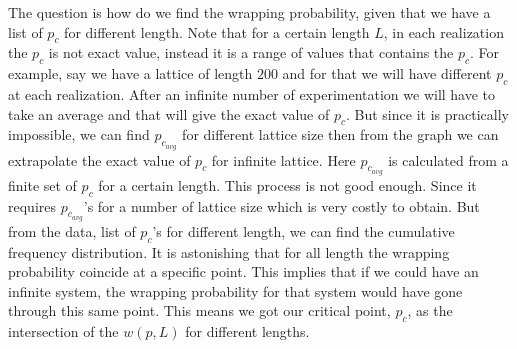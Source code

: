 	The question is how do we find the wrapping probability, given that we have a list of $p_c$ for different length. Note that for a certain length $L$, in each realization the $p_c$ is not exact value, instead it is a range of values that contains the $p_c$. For example, say we have a lattice of length $200$ and for that we will have different $p_c$ at each realization. After an infinite number of experimentation we will have to take an average and that will give the exact value of $p_c$. But since it is practically impossible, we can find $p_{c_{avg}}$ for different lattice size then from the graph we can extrapolate the exact value of $p_c$ for infinite lattice. Here $p_{c_{avg}}$ is calculated from a finite set of $p_c$ for a certain length. This process is not good enough. Since it requires  $p_{c_{avg}}$'s for a number of lattice size which is very costly to obtain. But from the data, list of $p_c$'s for different length, we can find the cumulative frequency distribution. It is astonishing  that for all length the wrapping probability coincide at a specific point. This implies that if we could have an infinite system, the wrapping probability for that system would have gone through this same point. This means we got our critical point, $p_c$, as the intersection of the $w(p,L)$ for different lengths.
